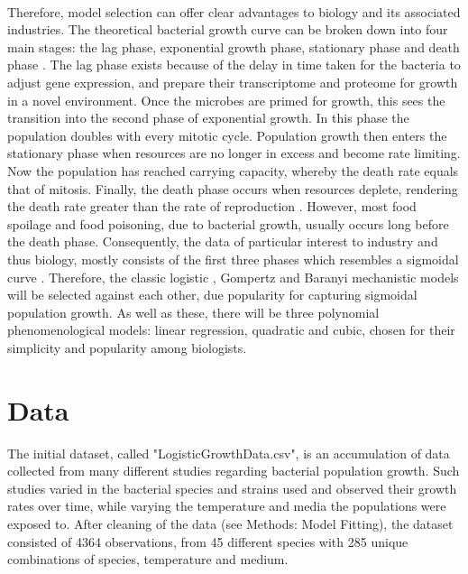 \documentclass[11pt, a4paper]{article} %
\begin{document}
\paragraph{} Therefore, model selection can offer clear advantages to biology and its associated industries.
The theoretical bacterial growth curve can be broken down into four main stages: the lag phase, exponential growth phase, stationary phase and death phase \citep{RN106}. The lag phase exists because of the delay in time taken for the bacteria to adjust gene expression, and prepare their transcriptome and proteome for growth in a novel environment. Once the microbes are primed for growth, this sees the transition into the second phase of exponential growth. In this phase the population doubles with every mitotic cycle. Population growth then enters the stationary phase when resources are no longer in excess and become rate limiting. Now the population has reached carrying capacity, whereby the death rate equals that of mitosis. Finally, the death phase occurs when resources deplete, rendering the death rate greater than the rate of reproduction \citep{RN106}. However, most food spoilage and food poisoning, due to bacterial growth, usually occurs long before the death phase. Consequently, the data of particular interest to industry and thus biology, mostly consists of the first three phases which resembles a sigmoidal curve \citep{RN110}. Therefore, the classic logistic \citep{RN106}, Gompertz \citep{RN73} and Baranyi \citep{RN110} mechanistic models will be selected against each other, due popularity for capturing sigmoidal population growth. As well as these, there will be three polynomial phenomenological models: linear regression, quadratic and cubic, chosen for their simplicity and popularity among biologists.

\section{Data}

The initial dataset, called "LogisticGrowthData.csv", is an accumulation of data collected from many different studies regarding bacterial population growth. Such studies varied in the bacterial species and strains used and observed their growth rates over time, while varying the temperature and media the populations were exposed to. After cleaning of the data (see Methods: Model Fitting), the dataset consisted of 4364 observations, from 45 different species with 285 unique combinations of species, temperature and medium. 
\end{document}
